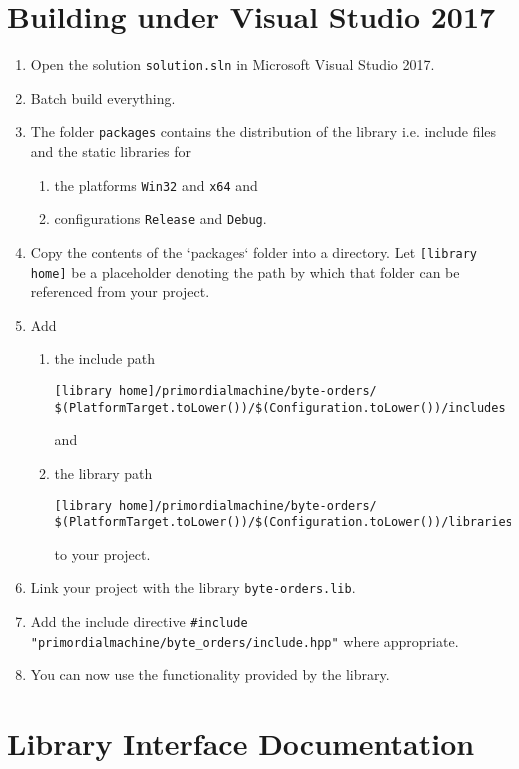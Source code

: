\documentclass[oneside]{article}
\begin{document}
\section{Building under Visual Studio 2017}
\begin{enumerate}
\item Open the solution \texttt{solution.sln} in Microsoft Visual Studio 2017.
\item Batch build everything.
\item The folder \verb+packages+ contains the distribution of the library i.e. include files and the
      static libraries for
  \begin{enumerate}
    \item the platforms \verb+Win32+ and \verb+x64+ and
    \item configurations \verb+Release+ and \verb+Debug+.
  \end{enumerate}
\item Copy the contents of the `packages` folder into a directory. Let
      \verb+[library home]+ be a placeholder denoting the path by which that folder
      can be referenced from your project. 
\item Add
  \begin{enumerate}
    \item the include path
\begin{verbatim}
[library home]/primordialmachine/byte-orders/
$(PlatformTarget.toLower())/$(Configuration.toLower())/includes
\end{verbatim}
	and
    \item the library path
\begin{verbatim}
[library home]/primordialmachine/byte-orders/
$(PlatformTarget.toLower())/$(Configuration.toLower())/libraries
\end{verbatim}
    to your project.
\end{enumerate}
\item Link your project with the library \verb+byte-orders.lib+.
\item Add the include directive \lstinline{#include "primordialmachine/byte_orders/include.hpp"} where appropriate.
\item You can now use the functionality provided by the library.
\end{enumerate}

\section{Library Interface Documentation}
\end{document}
